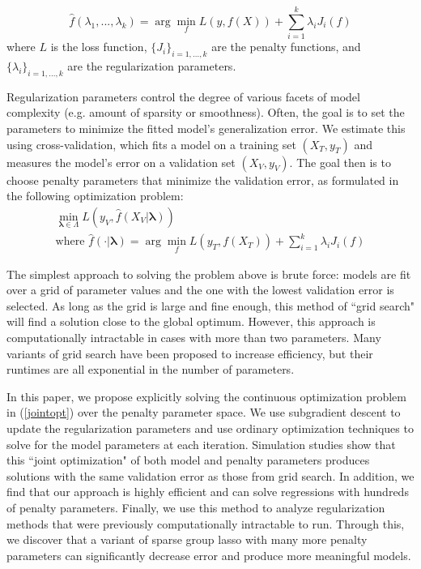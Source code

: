 \documentclass[10pt,letterpaper]{article}
\begin{document}
\begin{equation} \label {eq:basic}
\hat f(\lambda_1, ..., \lambda_k) = \arg \min_f L(y, f (X)) + \sum\limits_{i=1}^k \lambda_i J_i(f)
\end{equation}
where $L$ is the loss function, $\{J_i\}_{i=1, ..., k}$ are the penalty functions, and $\{\lambda_i\}_{i=1, ..., k}$ are the regularization parameters.

Regularization parameters control the degree of various facets of model complexity (e.g. amount of sparsity or smoothness). Often, the goal is to set the parameters to minimize the fitted model's generalization error. We estimate this using cross-validation, which fits a model on a training set $(X_T, y_T)$ and measures the model's error on a validation set $(X_V, y_V)$. The goal then is to choose penalty parameters that minimize the validation error, as formulated in the following optimization problem:
\begin{equation}
\begin{array}{c}
\min_{\boldsymbol{\lambda} \in \Lambda} L(y_V, \hat f (X_V | \boldsymbol{\lambda})) \\
\text{where } \hat f(\cdot | \boldsymbol{\lambda}) = \arg \min_f L(y_T, f (X_T)) + \sum\limits_{i=1}^k \lambda_i J_i(f)
\end{array}
\label{jointopt}
\end{equation}

The simplest approach to solving the problem above is brute force: models are fit over a grid of parameter values and the one with the lowest validation error is selected. As long as the grid is large and fine enough, this method of ``grid search" will find a solution close to the global optimum. However, this approach is computationally intractable in cases with more than two parameters. Many variants of grid search have been proposed to increase efficiency, but their runtimes are all exponential in the number of parameters.

In this paper, we propose explicitly solving the continuous optimization problem in (\ref{jointopt}) over the penalty parameter space. We use subgradient descent to update the regularization parameters and use ordinary optimization techniques to solve for the model parameters at each iteration. Simulation studies show that this ``joint optimization" of both model and penalty parameters produces solutions with the same validation error as those from grid search. In addition, we find that our approach is highly efficient and can solve regressions with hundreds of penalty parameters. Finally, we use this method to analyze regularization methods that were previously computationally intractable to run. Through this, we discover that a variant of sparse group lasso with many more penalty parameters can significantly decrease error and produce more meaningful models.
\end{document}
